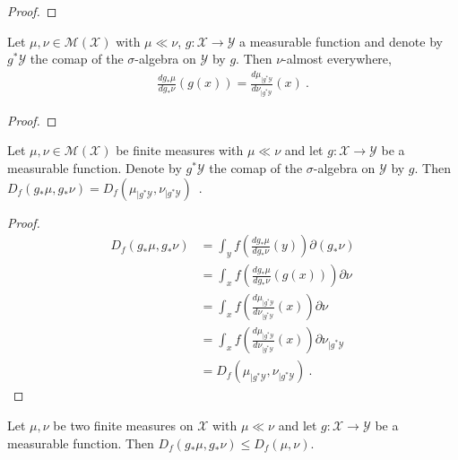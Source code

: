 \begin{proof}%
\uses{}

\end{proof}


\begin{lemma}
  \label{lem:rnDeriv_map_eq_rnDeriv_trim}
  \uses{}
  Let $\mu, \nu \in \mathcal M(\mathcal X)$ with $\mu \ll \nu$, $g : \mathcal X \to \mathcal Y$ a measurable function and denote by $g^* \mathcal Y$ the comap of the $\sigma$-algebra on $\mathcal Y$ by $g$.
  Then $\nu$-almost everywhere,
  \begin{align*}
  \frac{d g_*\mu}{d g_*\nu}(g(x)) = \frac{d \mu_{| g^* \mathcal Y}}{d \nu_{| g^* \mathcal Y}}(x)
  \: .
  \end{align*}
\end{lemma}

\begin{proof}%
{}

\end{proof}


\begin{lemma}
  \label{lem:fDiv_map_eq_fDiv_trim_of_ac}
  Let $\mu, \nu \in \mathcal M(\mathcal X)$ be finite measures with $\mu \ll \nu$ and let $g : \mathcal X \to \mathcal Y$ be a measurable function. Denote by $g^* \mathcal Y$ the comap of the $\sigma$-algebra on $\mathcal Y$ by $g$. Then
  $D_f(g_* \mu, g_* \nu) = D_f(\mu_{| g^* \mathcal Y}, \nu_{| g^* \mathcal Y})$~.
\end{lemma}

\begin{proof}%
{}
\begin{align*}
D_f(g_* \mu, g_* \nu)
&= \int_y f \left( \frac{d g_*\mu}{d g_*\nu}(y)\right) \partial(g_*\nu)
\\
&= \int_x f \left( \frac{d g_*\mu}{d g_*\nu}(g(x))\right) \partial\nu
\\
&= \int_x f \left(\frac{d \mu_{| g^* \mathcal Y}}{d \nu_{| g^* \mathcal Y}}(x) \right) \partial\nu
\\
&= \int_x f \left(\frac{d \mu_{| g^* \mathcal Y}}{d \nu_{| g^* \mathcal Y}}(x) \right) \partial\nu_{| g^* \mathcal Y}
\\
&= D_f(\mu_{| g^* \mathcal Y}, \nu_{| g^* \mathcal Y})
\: .
\end{align*}
\end{proof}


\begin{lemma}
  \label{lem:fDiv_map_le_of_ac}
  Let $\mu, \nu$ be two finite measures on $\mathcal X$ with $\mu \ll \nu$ and let $g : \mathcal X \to \mathcal Y$ be a measurable function. Then
  $D_f(g_* \mu, g_* \nu) \le D_f(\mu, \nu)$.
\end{lemma}

